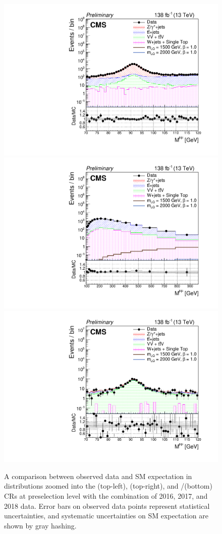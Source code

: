 \begin{figure}[H]
    \centering
    {\includegraphics[width=.49\textwidth]{Images/Analysis/Results_combined_Unblinded/Plots/Preselection/BasicLQ_uujj_M_uu_controlzoom_ZRegion.pdf}}
    {\includegraphics[width=.49\textwidth]{Images/Analysis/Results_combined_Unblinded/Plots/Preselection/BasicLQ_uujj_M_uu_controlzoom_TTRegion.pdf}}
    {\includegraphics[width=.49\textwidth]{Images/Analysis/Results_combined_Unblinded/Plots/Preselection/BasicLQ_uujj_M_uu_controlzoom_VVRegion.pdf}}
    \caption{A comparison between observed data and SM expectation in \Muu distributions zoomed into the \ZJETS (top-left), \ttbar (top-right), and \VV/\TTV (bottom) CRs at preselection level with the combination of 2016, 2017, and 2018 data. Error bars on observed data points represent statistical uncertainties, and systematic uncertainties on SM expectation are shown by gray hashing.}
    \label{figapp:preselmasszoomcombined}
\end{figure}